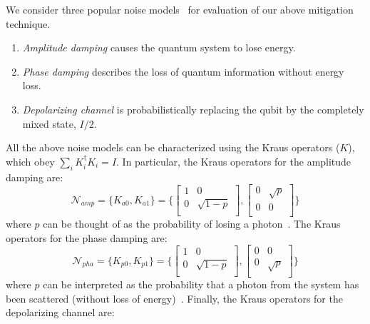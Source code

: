 We consider three popular noise models~\cite{nielsen2010quantum} for evaluation of our above mitigation technique. 
\begin{enumerate}
    \item \emph{Amplitude damping} causes the quantum system to lose energy.
    \item \emph{Phase damping} describes the loss of quantum information without energy loss.
    \item \emph{Depolarizing channel} is probabilistically replacing the qubit by the completely mixed state, $I/2$.
\end{enumerate}
All the above noise models can be characterized using the Kraus operators ($K$), which obey $\sum_{i} K_{i}^{\dagger}K_i=I$. In particular, the Kraus operators for the amplitude damping are:
$$ \mathcal{N}_{amp} = \{K_{a0}, K_{a1}\} = \{ \begin{bmatrix}
  1 & 0 \\
  0 & \sqrt{1 - p} \\
\end{bmatrix}, 
\begin{bmatrix}
  0 & \sqrt{p} \\
  0 & 0 \\
\end{bmatrix} \}$$
where $p$ can be thought of as the probability of losing a photon~\cite{nielsen2010quantum}. 
The Kraus operators for the phase damping are:
$$ \mathcal{N}_{pha} =   \{K_{p0}, K_{p1}\} = \{ \begin{bmatrix}
  1 & 0 \\
  0 & \sqrt{1 - p} \\
\end{bmatrix}, 
\begin{bmatrix}
  0 & 0 \\
  0 & \sqrt{p} \\
\end{bmatrix} \}$$
where $p$ can be interpreted as the probability that a photon from the system has been scattered (without loss of energy)~\cite{nielsen2010quantum}.
Finally, the Kraus operators for the depolarizing channel are:

